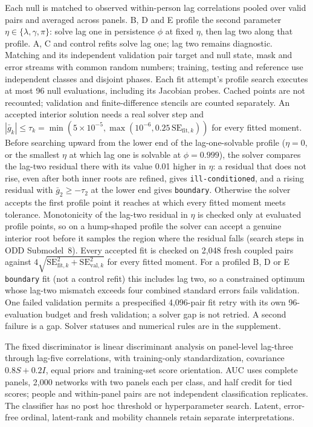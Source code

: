 Each null is matched to observed within-person lag correlations pooled over valid pairs and averaged across panels. %
B, D and E profile the second parameter $\eta\in\{\lambda,\gamma,\pi\}$: solve lag one in persistence $\phi$ at fixed $\eta$, then lag two along that profile. %
A, C and control refits solve lag one; lag two remains diagnostic. %
Matching and its independent validation pair target and null state, mask and error streams with common random numbers; training, testing and reference use independent classes and disjoint phases. %
Each fit attempt's profile search executes at most 96 null evaluations, including its Jacobian probes. Cached points are not recounted; validation and finite-difference stencils are counted separately. %
An accepted interior solution needs a real solver step and $|\bar g_k|\leq\tau_k=\min(5\times10^{-5},\max(10^{-6},0.25\,\mathrm{SE}_{\mathrm{fit},k}))$ for every fitted moment. %
Before searching upward from the lower end of the lag-one-solvable profile ($\eta=0$, or the smallest $\eta$ at which lag one is solvable at $\phi=0.999$), the solver compares the lag-two residual there with its value 0.01 higher in $\eta$: a residual that does not rise, even after both inner roots are refined, gives \texttt{ill-conditioned}, and a rising residual with $\bar g_2\geq-\tau_2$ at the lower end gives \texttt{boundary}. %
Otherwise the solver accepts the first profile point it reaches at which every fitted moment meets tolerance. %
Monotonicity of the lag-two residual in $\eta$ is checked only at evaluated profile points, so on a hump-shaped profile the solver can accept a genuine interior root before it samples the region where the residual falls (search steps in ODD Submodel~8). %
Every accepted fit is checked on 2,048 fresh coupled pairs against $4\sqrt{\mathrm{SE}_{\mathrm{fit},k}^2+\mathrm{SE}_{\mathrm{val},k}^2}$ for every fitted moment. %
For a profiled B, D or E \texttt{boundary} fit (not a control refit) this includes lag two, so a constrained optimum whose lag-two mismatch exceeds four combined standard errors fails validation. %
One failed validation permits a prespecified 4,096-pair fit retry with its own 96-evaluation budget and fresh validation; a solver gap is not retried. %
A second failure is a gap. %
Solver statuses and numerical rules are in the supplement. %

The fixed discriminator is linear discriminant analysis on panel-level lag-three through lag-five correlations, with training-only standardization, covariance $0.8S+0.2I$, equal priors and training-set score orientation. %
AUC uses complete panels, 2,000 networks with two panels each per class, and half credit for tied scores; people and within-panel pairs are not independent classification replicates. %
The classifier has no post hoc threshold or hyperparameter search. %
Latent, error-free ordinal, latent-rank and mobility channels retain separate interpretations. %

